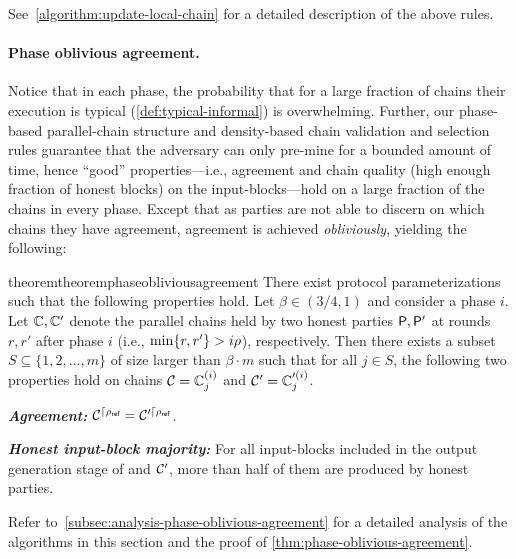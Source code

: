 \noindent See~\cref{algorithm:update-local-chain} for a detailed description of the above rules.



\paragraph{Phase oblivious agreement.}
%
Notice that in each phase, the probability that for a large fraction of chains their execution is typical (\cref{def:typical-informal}) is overwhelming.
%
Further, our phase-based parallel-chain structure and density-based chain validation and selection rules guarantee that the adversary can only pre-mine for a bounded amount of time, hence ``good'' properties---i.e., agreement and chain quality (high enough fraction of honest blocks) on the input-blocks---hold on a large fraction of the chains in every phase.
%
Except that as parties are not able to discern on which chains they have agreement, agreement is achieved \emph{obliviously}, yielding the following:

\begin{restatable}{theorem}{theoremphaseobliviousagreement}
      \label{thm:phase-oblivious-agreement}
      There exist protocol parameterizations such that the following properties hold.
      Let $\beta \in (3 / 4, 1)$ and consider a phase $i$.
      Let $\mathbb{C}, \mathbb{C}'$ denote the parallel chains held by two honest parties $\mathsf{P}, \mathsf{P}'$ at rounds $r, r'$ after phase $i$ (i.e., $\min\{r, r'\} > i \rho$), respectively.
      Then there exists a subset $S \subseteq \{1, 2, \ldots, m \}$ of size larger than $\beta \cdot m$ such that for all $j \in S$, the following two properties hold on chains $\mathcal{C} = \mathbb{C}^{(i)}_j$ and $\mathcal{C}' = \mathbb{C}'^{(i)}_j$.
      \begin{cccItemize}[nosep]
            \item \textbf{\emph{Agreement:}} $\mathcal{C}^{\lceil{\ensuremath{\rho_{\textsf{ref}}}}} = \mathcal{C}'^{\lceil{\ensuremath{\rho_{\textsf{ref}}}}}$.
            
            \item \textbf{\emph{Honest input-block majority:}}  For all input-blocks included in the output generation stage of \chain and $\mathcal{C}'$, more than half of them are produced by honest parties.
      \end{cccItemize}
\end{restatable}

Refer to~\cref{subsec:analysis-phase-oblivious-agreement} for a detailed analysis of the algorithms in this section and the proof of \cref{thm:phase-oblivious-agreement}.
